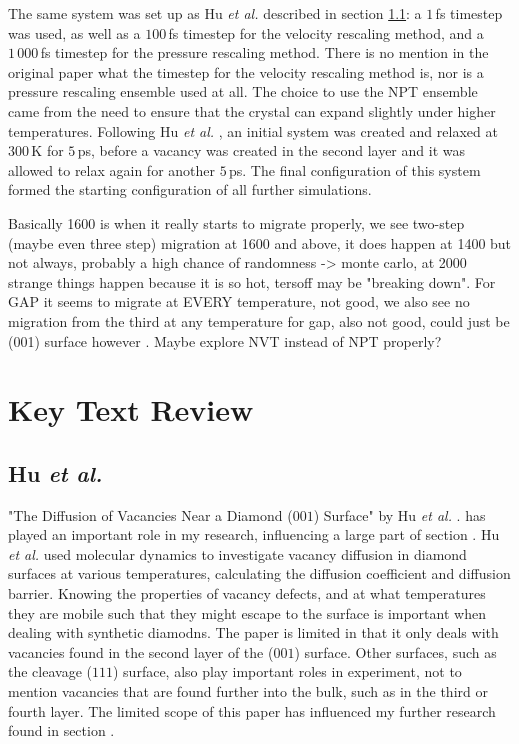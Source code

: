\documentclass[10pt,a4paper,twocolumn,twoside]{extarticle}
\newcommand{\al}{\emph{et al. }}
\begin{document}
The same system was set up as Hu \al described in section \ref{Hu}: a $1$\,fs timestep was used, as well as a $100$\,fs timestep for the velocity rescaling method, and a $1\,000$\,fs timestep for the pressure rescaling method. There is no mention in the original paper what the timestep for the velocity rescaling method is, nor is a pressure rescaling ensemble used at all. The choice to use the NPT ensemble came from the need to ensure that the crystal can expand slightly under higher temperatures. Following Hu \al, an initial system was created and relaxed at $300$\,K for $5$\,ps, before a vacancy was created in the second layer and it was allowed to relax again for another $5$\,ps. The final configuration of this system formed the starting configuration of all further simulations. 

Basically 1600 is when it really starts to migrate properly, we see two-step (maybe even three step) migration at 1600 and above, it does happen at 1400 but not always, probably a high chance of randomness -> monte carlo, at 2000 strange things happen because it is so hot, tersoff may be "breaking down". For GAP it seems to migrate at EVERY temperature, not good, we also see no migration from the third at any temperature for gap, also not good, could just be (001) surface however . Maybe explore NVT instead of NPT properly?


\section{Key Text Review}
\subsection{Hu \al}
\label{Hu}
"The Diffusion of Vacancies Near a Diamond ($001$) Surface" by Hu \al. has played an important role in my research, influencing a large part of section . Hu \al used molecular dynamics to investigate vacancy diffusion in diamond surfaces at various temperatures, calculating the diffusion coefficient and diffusion barrier. Knowing the properties of vacancy defects, and at what temperatures they are mobile such that they might escape to the surface is important when dealing with synthetic diamodns. The paper is limited in that it only deals with vacancies found in the second layer of the ($001$) surface. Other surfaces, such as the cleavage ($111$) surface, also play important roles in experiment, not to mention vacancies that are found further into the bulk, such as in the third or fourth layer. The limited scope of this paper has influenced my further research found in section .
\end{document}
